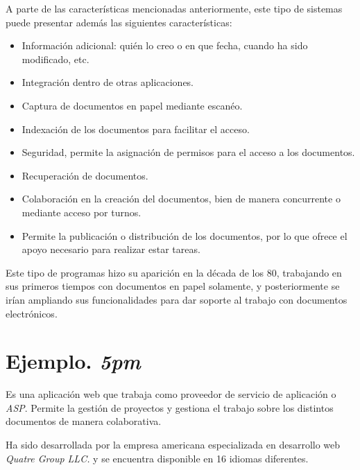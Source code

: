 \documentclass[11pt,a4paper,spanish,twoside]{report}
\begin{document}
A parte de las características mencionadas anteriormente, este tipo de
sistemas puede presentar además las siguientes características:
\begin{itemize}
    \item Información adicional: quién lo creo o en que fecha, cuando ha sido
    modificado, etc. 
    \item Integración dentro de otras aplicaciones.
    \item Captura de documentos en papel mediante escanéo.
    \item Indexación de los documentos para facilitar el acceso.
    \item Seguridad, permite la asignación de permisos para el acceso a los
      documentos.
    \item Recuperación de documentos.
    \item Colaboración en la creación del documentos, bien de manera
      concurrente o mediante acceso por turnos.
    \item Permite la publicación o distribución de los documentos, por lo que
      ofrece el apoyo necesario para realizar estar tareas.
\end{itemize}

Este tipo de programas hizo su aparición en la década de los 80, trabajando
en sus primeros tiempos con documentos en papel solamente, y posteriormente
se irían ampliando sus funcionalidades para dar soporte al trabajo con
documentos electrónicos.

\section{Ejemplo. \emph{5pm}}

Es una aplicación web que trabaja como proveedor de servicio de aplicación o
\emph{ASP}. Permite la gestión de proyectos y gestiona el trabajo sobre los
distintos documentos de manera colaborativa.

Ha sido desarrollada por la empresa americana especializada en desarrollo web
\emph{Quatre Group LLC.} y se encuentra disponible en 16 idiomas diferentes.
\end{document}

